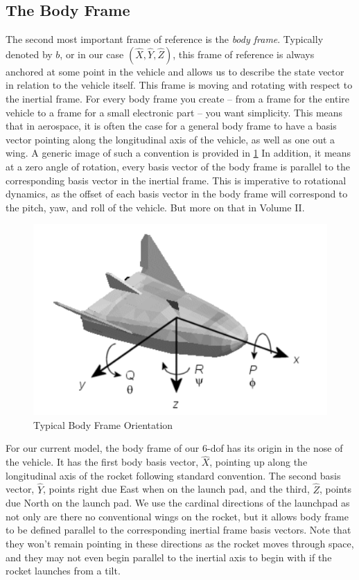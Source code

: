 \documentclass[12pt]{report}
\begin{document}
\subsection{The Body Frame}
The second most important frame of reference is the \textit{body frame}. Typically denoted by $b$, or in our case $(\hat{X},\hat{Y},\hat{Z})$, this frame of reference is always anchored at some point in the vehicle and allows us to describe the \gls{state vector} in relation to the vehicle itself. This frame is moving and rotating with respect to the inertial frame. For every body frame you create – from a frame for the entire vehicle to a frame for a small electronic part – you want simplicity. This means that in aerospace, it is often the case for a general body frame to have a basis vector pointing along the longitudinal axis of the vehicle, as well as one out a wing. A generic image of such a convention is provided in \ref{fig:BodyFrameTypical} In addition, it means at a zero angle of rotation, every basis vector of the body frame is parallel to the corresponding basis vector in the inertial frame. This is imperative to rotational dynamics, as the offset of each basis vector in the body frame will correspond to the pitch, yaw, and roll of the vehicle. But more on that in Volume II.


\begin{figure}[H]
\centering
    
\includegraphics[width=\linewidth]{BodyFrame.png}
    \caption{Typical Body Frame Orientation}
    \label{fig:BodyFrameTypical}
\end{figure}

For our current model, the body frame of our 6-\gls{dof} has its origin in the nose of the vehicle. It has the first body basis vector, $\hat{X}$, pointing up along the longitudinal axis of the rocket following standard convention. The second basis vector, $\hat{Y}$, points right due East when on the launch pad, and the third, $\hat{Z}$, points due North on the launch pad. We use the cardinal directions of the launchpad as not only are there no conventional wings on the rocket, but it allows body frame to be defined parallel to the corresponding inertial frame basis vectors. Note that they won’t remain pointing in these directions as the rocket moves through space, and they may not even begin parallel to the inertial axis to begin with if the rocket launches from a tilt.
\end{document}

